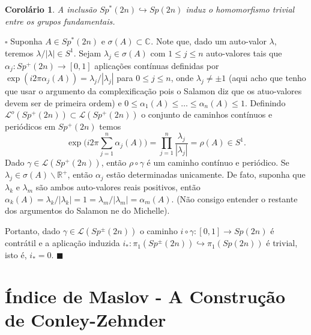 \documentclass[12pt]{book}
\newtheorem{corolario}[teorema]{Corolário}
\newenvironment{prova}[1]{$\square$ #1}{\hfill$\blacksquare$}
\newcommand{\caminhos}{\mathcal{L}}
\newcommand{\caminhosfechados}[1]{\caminhos^{o}(#1)}
\newcommand{\caminhossempontobase}[1]{\caminhos(#1)}
\newcommand{\circulo}{S^{1}}
\newcommand{\complementar}[2]{#1 \backslash #2}
\newcommand{\complexo}[1]{\mathbb{C}^{#1}}
\newcommand{\grupofundamental}[1]{\pi_{1}(#1)}
\newcommand{\gruposimpletico}[1]{Sp(#1)}
\newcommand{\gruposimpleticonaodegenerado}[1]{Sp^{#1}(2n)}
\newcommand{\real}[1]{\mathbb{R}^{#1}}
\newcommand{\vermelho}[1]{{\color{red}#1}}
\begin{document}
	\begin{corolario}
		A inclusão $\gruposimpleticonaodegenerado{*} \hookrightarrow \gruposimpletico{2n}$ induz o homomorfismo trivial entre os grupos fundamentais.
	\end{corolario}
	\begin{prova}
		
		Suponha $A \in \gruposimpleticonaodegenerado{*}$ e $\sigma(A) \subset \complexo{}$. Note que, dado um auto-valor $\lambda$, teremos  $\lambda/|\lambda| \in \circulo$. Sejam $\lambda_{j} \in \sigma(A)$ com $1\leq j\leq n $ auto-valores tais que $\alpha_{j}:\gruposimpleticonaodegenerado{+} \to [0,1]$ aplicações contínuas definidas por $\exp(i 2\pi\alpha_{j}(A)) = \lambda_{j}/|\lambda_{j}|$ para $0\leq j \leq n$,
		onde $\lambda_{j}\neq \pm 1$ \vermelho{ (aqui acho que tenho que usar o argumento da complexificação pois o Salamon diz que os atuo-valores devem ser de primeira ordem)} e $0\leq \alpha_{1}(A) \leq \dots \leq \alpha_{n}(A)\leq 1$. Definindo $\caminhosfechados{\gruposimpleticonaodegenerado{+}} \subset \caminhossempontobase{\gruposimpleticonaodegenerado{+}}$ o conjunto de caminhos contínuos e periódicos em $\gruposimpleticonaodegenerado{+}$ temos
		$$
		\exp\Big( i2\pi \sum_{j=1}^{n}\alpha_{j}(A) \Big) = \prod_{j=1}^{n}\frac{\lambda_{j}}{|\lambda_{j}|}=\rho(A) \in \circulo.
		$$ 
		Dado $\gamma \in \mathcal{L}(\gruposimpleticonaodegenerado{+})$, então $\rho \circ \gamma$ é um caminho contínuo e periódico. Se $\lambda_{j} \in \complementar{\sigma(A)}{\real{+}}$, então $\alpha_{j}$ estão determinadas unicamente. De fato, suponha que $\lambda_{k}$ e $\lambda_{m}$ são ambos auto-valores reais positivos, então $\alpha_{k}(A) = \lambda_{k}/|\lambda_{k}| =1 = \lambda_{m}/|\lambda_{m}| =\alpha_{m}(A)$. \vermelho{(Não consigo entender o restante dos argumentos do Salamon ne do Michelle).}
		
		Portanto, dado  $\gamma \in \mathcal{L}(\gruposimpleticonaodegenerado{\pm})$ o caminho $i\circ \gamma:[0,1] \to \gruposimpletico{2n}$ é contrátil e a aplicação induzida $i_{*}:\grupofundamental{\gruposimpleticonaodegenerado{\pm}} \hookrightarrow \grupofundamental{\gruposimpletico{2n}}$ é trivial, isto é, $i_{*} = 0$.
	\end{prova}
	
	\chapter{Índice de Maslov - A Construção de Conley-Zehnder}
\end{document}
